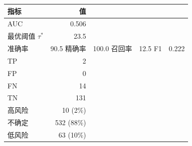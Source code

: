 \begin{tabular}{lr}
\toprule
指标 & 值 \\
\midrule
AUC & 0.506 \\
最优阈值 $\tau^*$ & 23.5 \\
准确率 & 90.5%
精确率 & 100.0%
召回率 & 12.5%
F1 & 0.222 \\
\midrule
TP & 2 \\
FP & 0 \\
FN & 14 \\
TN & 131 \\
\midrule
高风险 & 10 (2\%) \\
不确定 & 532 (88\%) \\
低风险 & 63 (10\%) \\
\bottomrule
\end{tabular}

